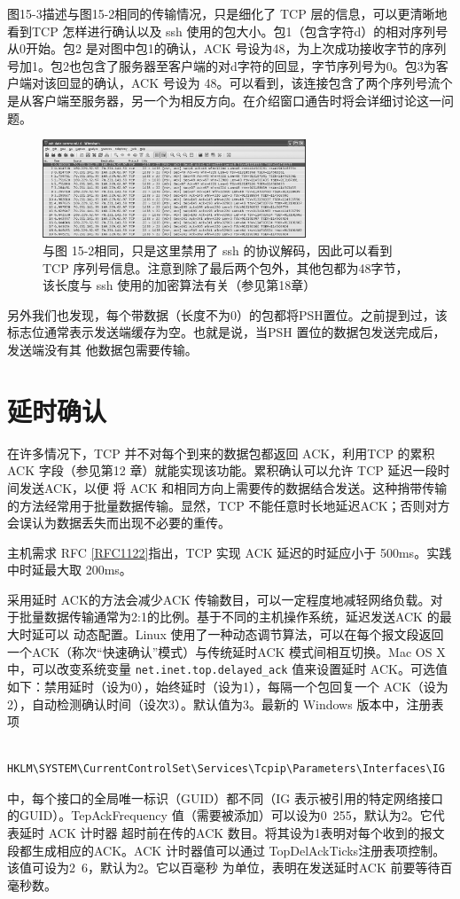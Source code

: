 图15-3描述与图15-2相同的传输情况，只是细化了 TCP 层的信息，可以更清晰地看到TCP 怎样进行确认以及 ssh 使用的包大小。包1（包含字符d）的相对序列号从0开始。包2
是对图中包1的确认，ACK 号设为48，为上次成功接收字节的序列号加1。包2也包含了服务器至客户端的对d字符的回显，字节序列号为0。包3为客户端对该回显的确认，ACK
号设为 48。可以看到，该连接包含了两个序列号流个是从客户端至服务器，另一个为相反方向。在介绍窗口通告时将会详细讨论这一问题。

\begin{figure}[!htb]
    \centering
	\includegraphics[width=0.7\textwidth]{imgs/15/15-3.png}
	\caption{与图 15-2相同，只是这里禁用了 ssh 的协议解码，因此可以看到 TCP 序列号信息。注意到除了最后两个包外，其他包都为48字节，该长度与 ssh 使用的加密算法有关（参见第18章）}
\end{figure}

另外我们也发现，每个带数据（长度不为0）的包都将PSH置位。之前提到过，该标志位通常表示发送端缓存为空。也就是说，当PSH 置位的数据包发送完成后，发送端没有其
他数据包需要传输。

\section{延时确认}
在许多情况下，TCP 并不对每个到来的数据包都返回 ACK，利用TCP 的累积ACK 字段（参见第12 章）就能实现该功能。累积确认可以允许 TCP 延迟一段时间发送ACK，以便
将 ACK 和相同方向上需要传的数据结合发送。这种捎带传输的方法经常用于批量数据传输。显然，TCP 不能任意时长地延迟ACK；否则对方会误认为数据丢失而出现不必要的重传。

\begin{tcolorbox}
    主机需求 RFC \href{https://www.rfc-editor.org/rfc/rfc1122}{[RFC1122]}指出，TCP 实现 ACK 延迟的时延应小于 500ms。实践中时延最大取 200ms。
\end{tcolorbox}

采用延时 ACK的方法会减少ACK 传输数目，可以一定程度地减轻网络负载。对于批量数据传输通常为2:1的比例。基于不同的主机操作系统，延迟发送ACK 的最大时延可以
动态配置。Linux 使用了一种动态调节算法，可以在每个报文段返回一个ACK（称次“快速确认”模式）与传统延时ACK 模式间相互切换。Mac OS X 中，可以改变系统变量 
\verb|net.inet.top.delayed_ack| 值来设置延时 ACK。可选值如下：禁用延时（设为0），始终延时（设为1），每隔一个包回复一个 ACK（设为2），自动检测确认时间（设次3）。默认值为3。最新的
Windows 版本中，注册表项
\begin{verbatim}
    HKLM\SYSTEM\CurrentControlSet\Services\Tcpip\Parameters\Interfaces\IG
\end{verbatim}
中，每个接口的全局唯一标识（GUID）都不同（IG 表示被引用的特定网络接口的GUID）。TepAckFrequency 值（需要被添加）可以设为0~255，默认为2。它代表延时 ACK 计时器
超时前在传的ACK 数目。将其设为1表明对每个收到的报文段都生成相应的ACK。ACK 计时器值可以通过 TopDelAckTicks注册表项控制。该值可设为2~6，默认为2。它以百毫秒
为单位，表明在发送延时ACK 前要等待百毫秒数。

